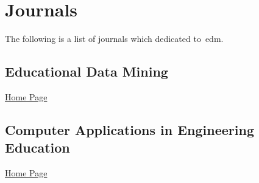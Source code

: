 \chapter{Journals}

The following is a list of journals which dedicated to~\gls{edm}.

\section{Educational Data Mining}

\href{http://www.educationaldatamining.org/proceedings}{Home Page}

\section{Computer Applications in Engineering Education}

\href{http://onlinelibrary.wiley.com/journal/10.1002/(ISSN)1099-0542}{Home Page}
